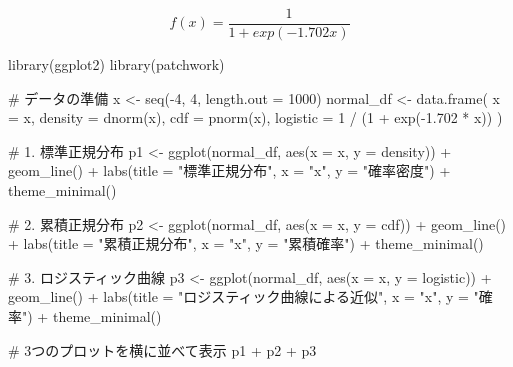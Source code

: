 \documentclass[
  a4paper,
]{ltjsbook}
\newenvironment{Shaded}{\begin{snugshade}}{\end{snugshade}}
\newcommand{\AttributeTok}[1]{\textcolor[rgb]{0.40,0.45,0.13}{#1}}
\newcommand{\CommentTok}[1]{\textcolor[rgb]{0.37,0.37,0.37}{#1}}
\newcommand{\DecValTok}[1]{\textcolor[rgb]{0.68,0.00,0.00}{#1}}
\newcommand{\FloatTok}[1]{\textcolor[rgb]{0.68,0.00,0.00}{#1}}
\newcommand{\FunctionTok}[1]{\textcolor[rgb]{0.28,0.35,0.67}{#1}}
\newcommand{\NormalTok}[1]{\textcolor[rgb]{0.00,0.23,0.31}{#1}}
\newcommand{\OtherTok}[1]{\textcolor[rgb]{0.00,0.23,0.31}{#1}}
\newcommand{\SpecialCharTok}[1]{\textcolor[rgb]{0.37,0.37,0.37}{#1}}
\newcommand{\StringTok}[1]{\textcolor[rgb]{0.13,0.47,0.30}{#1}}
\begin{document}
\[ f(x) = \frac{1}{1 + exp(-1.702x)} \]

\begin{Shaded}
\begin{Highlighting}[]
\FunctionTok{library}\NormalTok{(ggplot2)}
\FunctionTok{library}\NormalTok{(patchwork)}

\CommentTok{\# データの準備}
\NormalTok{x }\OtherTok{\textless{}{-}} \FunctionTok{seq}\NormalTok{(}\SpecialCharTok{{-}}\DecValTok{4}\NormalTok{, }\DecValTok{4}\NormalTok{, }\AttributeTok{length.out =} \DecValTok{1000}\NormalTok{)}
\NormalTok{normal\_df }\OtherTok{\textless{}{-}} \FunctionTok{data.frame}\NormalTok{(}
  \AttributeTok{x =}\NormalTok{ x,}
  \AttributeTok{density =} \FunctionTok{dnorm}\NormalTok{(x),}
  \AttributeTok{cdf =} \FunctionTok{pnorm}\NormalTok{(x),}
  \AttributeTok{logistic =} \DecValTok{1} \SpecialCharTok{/}\NormalTok{ (}\DecValTok{1} \SpecialCharTok{+} \FunctionTok{exp}\NormalTok{(}\SpecialCharTok{{-}}\FloatTok{1.702} \SpecialCharTok{*}\NormalTok{ x))}
\NormalTok{)}

\CommentTok{\# 1. 標準正規分布}
\NormalTok{p1 }\OtherTok{\textless{}{-}} \FunctionTok{ggplot}\NormalTok{(normal\_df, }\FunctionTok{aes}\NormalTok{(}\AttributeTok{x =}\NormalTok{ x, }\AttributeTok{y =}\NormalTok{ density)) }\SpecialCharTok{+}
  \FunctionTok{geom\_line}\NormalTok{() }\SpecialCharTok{+}
  \FunctionTok{labs}\NormalTok{(}\AttributeTok{title =} \StringTok{"標準正規分布"}\NormalTok{,}
       \AttributeTok{x =} \StringTok{"x"}\NormalTok{,}
       \AttributeTok{y =} \StringTok{"確率密度"}\NormalTok{) }\SpecialCharTok{+}
  \FunctionTok{theme\_minimal}\NormalTok{()}

\CommentTok{\# 2. 累積正規分布}
\NormalTok{p2 }\OtherTok{\textless{}{-}} \FunctionTok{ggplot}\NormalTok{(normal\_df, }\FunctionTok{aes}\NormalTok{(}\AttributeTok{x =}\NormalTok{ x, }\AttributeTok{y =}\NormalTok{ cdf)) }\SpecialCharTok{+}
  \FunctionTok{geom\_line}\NormalTok{() }\SpecialCharTok{+}
  \FunctionTok{labs}\NormalTok{(}\AttributeTok{title =} \StringTok{"累積正規分布"}\NormalTok{,}
       \AttributeTok{x =} \StringTok{"x"}\NormalTok{,}
       \AttributeTok{y =} \StringTok{"累積確率"}\NormalTok{) }\SpecialCharTok{+}
  \FunctionTok{theme\_minimal}\NormalTok{()}

\CommentTok{\# 3. ロジスティック曲線}
\NormalTok{p3 }\OtherTok{\textless{}{-}} \FunctionTok{ggplot}\NormalTok{(normal\_df, }\FunctionTok{aes}\NormalTok{(}\AttributeTok{x =}\NormalTok{ x, }\AttributeTok{y =}\NormalTok{ logistic)) }\SpecialCharTok{+}
  \FunctionTok{geom\_line}\NormalTok{() }\SpecialCharTok{+}
  \FunctionTok{labs}\NormalTok{(}\AttributeTok{title =} \StringTok{"ロジスティック曲線による近似"}\NormalTok{,}
       \AttributeTok{x =} \StringTok{"x"}\NormalTok{,}
       \AttributeTok{y =} \StringTok{"確率"}\NormalTok{) }\SpecialCharTok{+}
  \FunctionTok{theme\_minimal}\NormalTok{()}

\CommentTok{\# 3つのプロットを横に並べて表示}
\NormalTok{p1 }\SpecialCharTok{+}\NormalTok{ p2 }\SpecialCharTok{+}\NormalTok{ p3}
\end{Highlighting}
\end{Shaded}
\end{document}
